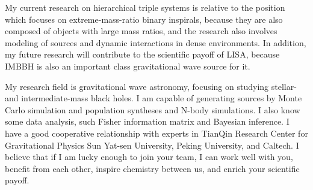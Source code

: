\documentclass[12pt,a4paper,sans]{article}%
\begin{document}
My current research on hierarchical triple systems is relative to the position which focuses on extreme-mass-ratio binary inspirals,
because they are also composed of objects with large mass ratios, and the research also involves modeling of sources and dynamic interactions in
dense environments. In addition, my future research will contribute to the scientific payoff of LISA, because IMBBH is 
also an important class gravitational wave source for it. 

My research field is gravitational wave astronomy, focusing on studying stellar- and intermediate-mass black holes. I am
capable of generating sources by Monte Carlo simulation and population syntheses and N-body simulations. I also know
some data analysis, such Fisher information matrix and Bayesian inference. I have a good cooperative relationship with
experts in TianQin Research Center for Gravitational Physics Sun Yat-sen University, Peking University, and Caltech. I believe that if I am lucky enough to join your team, I can work well with you, benefit from each other, inspire chemistry between us, and enrich your scientific payoff. 



%
\end{document}
